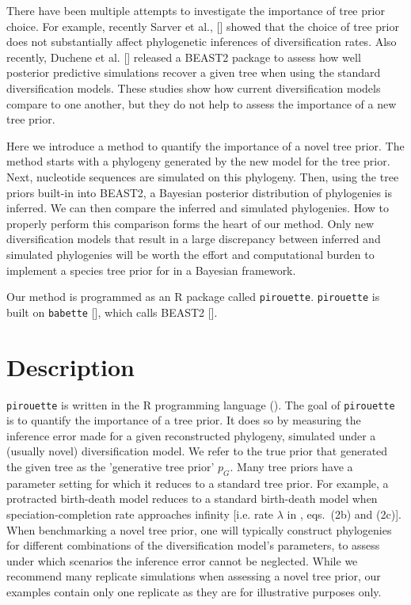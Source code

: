 There have been multiple attempts to investigate the importance of tree
prior choice. For example, recently Sarver et al., [\cite{sarver2019choice}] 
showed that the choice of tree prior does not 
substantially affect phylogenetic inferences of diversification rates.
Also recently, Duchene et al. [\cite{duchene2018phylodynamic}] released
a BEAST2 package to assess how well posterior predictive simulations
recover a given tree when using the standard diversification models.
These studies show how current diversification models compare
to one another, but they do not help to assess the importance of a new tree prior. 

Here we introduce a method to quantify the importance of a novel tree prior.
The method starts with a phylogeny generated by the new model for the tree prior. Next, nucleotide sequences are simulated on this phylogeny. Then, using the tree priors built-in into BEAST2, a Bayesian posterior distribution of phylogenies is inferred. We can then compare the inferred and simulated phylogenies. How to properly perform this comparison forms the heart of our method.
Only new diversification models that result in a large discrepancy between inferred and simulated phylogenies will be worth the effort and computational burden 
to implement a species tree prior for in a Bayesian framework.

Our method is programmed as an R package called \verb;pirouette;.
\verb;pirouette; is built on \verb;babette; [\cite{bilderbeek2018babette}], 
which calls BEAST2 [\cite{bouckaert2014beast}]. 

\section{Description}

\verb;pirouette; is written in the R programming language (\cite{R}).
The goal of \verb;pirouette; is to quantify the importance of a tree prior.
It does so by measuring the inference error made for a given reconstructed phylogeny, 
simulated under a (usually novel) diversification model.
We refer to the true prior that generated the given tree
as the 'generative tree prior' $\mathit{p_{G}}$.
Many tree priors have a parameter setting for which it reduces to a standard tree prior. For example, a protracted birth-death model reduces to a standard birth-death model when speciation-completion rate approaches infinity [i.e. rate $\lambda$ in \cite{etienne2014estimating}, eqs.~(2b) and (2c)].
When benchmarking a novel tree prior, 
one will typically construct phylogenies 
for different combinations of the diversification model's parameters, 
to assess under which scenarios the inference error cannot be neglected. 
While we recommend many replicate simulations when assessing a novel tree prior, our examples contain only one replicate as they are for illustrative purposes only.

